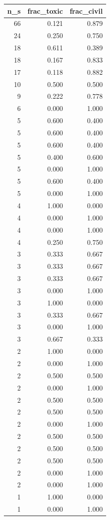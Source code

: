 \begin{tabular}{rrr}
\toprule
n_s & frac_toxic & frac_civil \\
\midrule
66 & 0.121 & 0.879 \\
24 & 0.250 & 0.750 \\
18 & 0.611 & 0.389 \\
18 & 0.167 & 0.833 \\
17 & 0.118 & 0.882 \\
10 & 0.500 & 0.500 \\
9 & 0.222 & 0.778 \\
6 & 0.000 & 1.000 \\
5 & 0.600 & 0.400 \\
5 & 0.600 & 0.400 \\
5 & 0.600 & 0.400 \\
5 & 0.400 & 0.600 \\
5 & 0.000 & 1.000 \\
5 & 0.600 & 0.400 \\
5 & 0.000 & 1.000 \\
4 & 1.000 & 0.000 \\
4 & 0.000 & 1.000 \\
4 & 0.000 & 1.000 \\
4 & 0.250 & 0.750 \\
3 & 0.333 & 0.667 \\
3 & 0.333 & 0.667 \\
3 & 0.333 & 0.667 \\
3 & 0.000 & 1.000 \\
3 & 1.000 & 0.000 \\
3 & 0.333 & 0.667 \\
3 & 0.000 & 1.000 \\
3 & 0.667 & 0.333 \\
2 & 1.000 & 0.000 \\
2 & 0.000 & 1.000 \\
2 & 0.500 & 0.500 \\
2 & 0.000 & 1.000 \\
2 & 0.500 & 0.500 \\
2 & 0.500 & 0.500 \\
2 & 0.000 & 1.000 \\
2 & 0.500 & 0.500 \\
2 & 0.500 & 0.500 \\
2 & 0.500 & 0.500 \\
2 & 0.000 & 1.000 \\
2 & 0.000 & 1.000 \\
1 & 1.000 & 0.000 \\
1 & 0.000 & 1.000 \\

\end{tabular}
